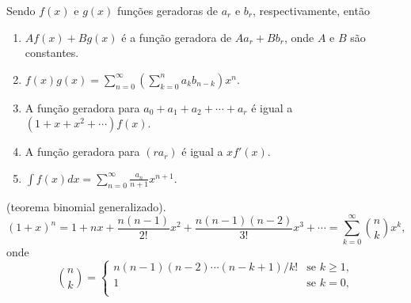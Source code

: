 \documentclass{article}
\begin{document}
\begin{thm} Sendo \(f(x)\) e \(g(x)\) funções geradoras de \(a_r\) e \(b_r\), respectivamente, então
    \begin{enumerate}
        \item[\textup{(a)}] \(Af(x) + Bg(x)\) é a função geradora de \(Aa_r + Bb_r\), onde \(A\) e \(B\) são constantes.
        \item[\textup{(b)}] \(\displaystyle f(x)g(x) = \sum_{n=0}^{\infty} \left( \sum_{k=0}^{n} a_k b_{n-k} \right) x^n\).
        \item[\textup{(c)}] A função geradora para \(a_0+a_1+a_2+\cdots+a_r\) é igual a \((1+x+x^2+\cdots)f(x)\).
        \item[\textup{(d)}] A função geradora para \((ra_r)\) é igual a \(xf'(x)\).
        \item[\textup{(e)}] \(\displaystyle \int f(x) dx = \sum_{n=0}^{\infty} \frac{a_n}{n+1} x^{n+1}\).
    \end{enumerate}
\end{thm}

\begin{thm} (teorema binomial generalizado).
    \begin{equation}
        (1+x)^n=1+nx+\frac{n(n-1)}{2!}x^2+\frac{n(n-1)(n-2)}{3!}x^3+\cdots = \sum_{k=0}^{\infty} \binom{n}{k} x^k,
    \end{equation}
    \noindent onde
    \[
        \binom{n}{k} = \begin{cases}
            n(n-1)(n-2)\cdots(n-k+1)/k! & \text{se } k \geq 1, \\
            1 & \text{se } k=0, \\
        \end{cases}
    \]
\end{thm}
\end{document}
